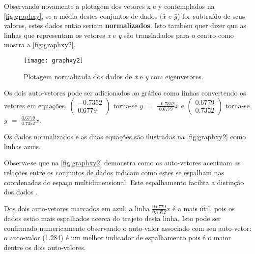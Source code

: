 \begin{comment}
$\begin{pmatrix} 0.6779 \\ 0.7352 \end{pmatrix}$  e 1.284
\end{center}

Ambos os eigenvetores possuem unidade de tamanho.


\subsubsection{Utilizando Eigenfaces como Componente Principal}\label{subsec:eigenacp}
\end{comment}


Observando novamente a plotagem dos vetores x e y contemplados na \autoref{fig:graphxy}, se a média destes conjuntos de dados ($\bar{x}$ e $\bar{y}$) for subtraído de seus valores, estes dados então seriam \textbf{normalizados}. Isto também quer dizer que as linhas que representam os vetores \textit{x} e \textit{y} são transladados para o centro como mostra a \autoref{fig:graphxy2}. 

\begin{figure}[h]
	\centering
	\texttt{[image: graphxy2]}
	\caption{Plotagem normalizada dos dados de \textit{x} e \textit{y} com eigenvetores.}
	\label{fig:graphxy2}
\end{figure}

Os dois auto-vetores pode ser adicionados ao gráfico como linhas convertendo os vetores em equações. 
$\begin{pmatrix} -0.7352 \\ 0.6779 \end{pmatrix}$ torna-se $y$ $=$ $\frac{-0.7352}{0.6779}$$x$  e $\begin{pmatrix} 0.6779 \\ 0.7352 \end{pmatrix}$ torna-se $y$ $=$ $\frac{0.6779}{0.7352}$$x$.

Os dados normalizados e as duas equações são ilustradas na \autoref{fig:graphxy2} como linhas azuis. 

Observa-se que na \autoref{fig:graphxy2} demonstra como os auto-vetores acentuam as relações entre os conjuntos de dados indicam como estes se espalham nas coordenadas do espaço multidimensional. Este espalhamento facilita a distinção dos dados \cite{drmathew_java_programming}.

Dos dois auto-vetores marcados em azul, a linha $\frac{0.6779}{0.7352}$$x$ é a mais útil, pois os dados estão mais espalhados acerca do trajeto desta linha. Isto pode ser confirmado numericamente observando o auto-valor associado com seu auto-vetor: o auto-valor (1.284) é um melhor indicador de espalhamento pois é o maior dentre os dois auto-valores.

